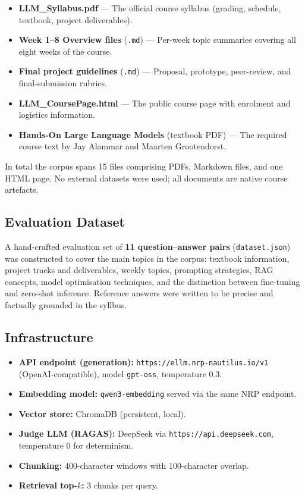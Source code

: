\documentclass[11pt,a4paper]{article}
\begin{document}
\begin{itemize}
    \item \textbf{LLM\_Syllabus.pdf} --- The official course syllabus (grading,
          schedule, textbook, project deliverables).
    \item \textbf{Week 1--8 Overview files} (\texttt{.md}) --- Per-week topic
          summaries covering all eight weeks of the course.
    \item \textbf{Final project guidelines} (\texttt{.md}) --- Proposal, prototype,
          peer-review, and final-submission rubrics.
    \item \textbf{LLM\_CoursePage.html} --- The public course page with enrolment
          and logistics information.
    \item \textbf{Hands-On Large Language Models} (textbook PDF) --- The required
          course text by Jay Alammar and Maarten Grootendorst.
\end{itemize}

In total the corpus spans 15 files comprising PDFs, Markdown files, and one HTML
page.  No external datasets were used; all documents are native course artefacts.

\subsection{Evaluation Dataset}

A hand-crafted evaluation set of \textbf{11 question--answer pairs}
(\texttt{dataset.json}) was constructed to cover the main topics in the corpus:
textbook information, project tracks and deliverables, weekly topics, prompting
strategies, RAG concepts, model optimisation techniques, and the distinction
between fine-tuning and zero-shot inference.  Reference answers were written to be
precise and factually grounded in the syllbus.

\subsection{Infrastructure}

\begin{itemize}
    \item \textbf{API endpoint (generation):} \texttt{https://ellm.nrp-nautilus.io/v1}
          (OpenAI-compatible), model \texttt{gpt-oss}, temperature 0.3.
    \item \textbf{Embedding model:} \texttt{qwen3-embedding} served via the same
          NRP endpoint.
    \item \textbf{Vector store:} ChromaDB (persistent, local).
    \item \textbf{Judge LLM (RAGAS):} DeepSeek via \texttt{https://api.deepseek.com},
          temperature 0 for determinism.
    \item \textbf{Chunking:} 400-character windows with 100-character overlap.
    \item \textbf{Retrieval top-$k$:} 3 chunks per query.
\end{itemize}
\end{document}
